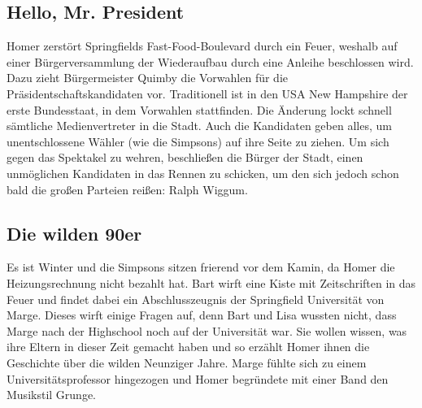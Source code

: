 \subsection{Hello, Mr. President}
Homer zerstört Springfields Fast-Food-Boulevard durch ein Feuer, weshalb auf einer Bür\-ger\-ver\-samm\-lung der Wiederaufbau durch eine Anleihe beschlossen wird. Dazu zieht Bürgermeister Quimby die Vorwahlen für die Prä\-si\-dent\-schafts\-kan\-di\-dat\-en vor. Traditionell ist in den USA New Hampshire der erste Bundesstaat, in dem Vorwahlen stattfinden. Die Änderung lockt schnell sämtliche Medienvertreter in die Stadt. Auch die Kandidaten geben alles, um unentschlossene Wähler (wie die Simpsons) auf ihre Seite zu ziehen. Um sich gegen das Spektakel zu wehren, beschließen die Bürger der Stadt, einen unmöglichen Kandidaten in das Rennen zu schicken, um den sich jedoch schon bald die großen Parteien reißen: Ralph Wiggum.
 



\subsection{Die wilden 90er}\label{KABF04}
Es ist Winter und die Simpsons sitzen frierend vor dem Kamin, da Homer die Heizungsrechnung nicht bezahlt hat. Bart wirft eine Kiste mit Zeitschriften in das Feuer und findet dabei ein Abschlusszeugnis der Springfield Universität von Marge. Dieses wirft einige Fragen auf, denn Bart und Lisa wussten nicht, dass Marge nach der Highschool noch auf der Universität war. Sie wollen wissen, was ihre Eltern in dieser Zeit gemacht haben und so erzählt Homer ihnen die Geschichte über die wilden Neunziger Jahre. Marge fühlte sich zu einem Universitätsprofessor hingezogen und Homer begründete mit einer Band den Musikstil Grunge.



